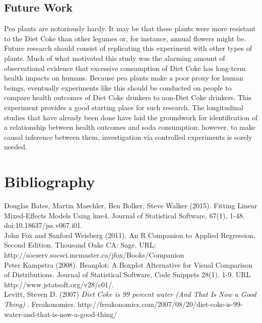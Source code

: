 \documentclass[1p,12pt]{elsarticle}\usepackage[]{graphicx}\usepackage[]{color}
\begin{document}
\subsection{Future Work}
Pea plants are notoriously hardy. It may be that these plants were more resistant to the Diet Coke than other legumes or, for instance, annual flowers might be. Future research should consist of replicating this experiment with other types of plants.  Much of what motivated this study was the alarming amount of observational evidence that excessive consumption of Diet Coke has long-term health impacts on humans. Because pea plants make a poor proxy for human beings, eventually experiments like this should be conducted on people to compare health outcomes of Diet Coke drinkers to non-Diet Coke drinkers. This experiment provides a good starting place for such research.  The longitudinal studies that have already been done have laid the groundwork for identification of a relationship between health outcomes and soda consumption; however, to make causal inference between them, investigation via controlled experiments is sorely needed. 



\newpage

\section{Bibliography}

  Douglas Bates, Martin Maechler, Ben Bolker, Steve Walker (2015). Fitting Linear Mixed-Effects Models Using lme4. Journal of Statistical Software, 67(1), 1-48. doi:10.18637/jss.v067.i01.
~ \\ 

John Fox and Sanford Weisberg (2011). An {R} Companion to Applied Regression, Second Edition. Thousand Oaks CA: Sage. URL:  \\http://socserv.socsci.mcmaster.ca/jfox/Books/Companion
~\\

Peter Kampstra (2008). Beanplot: A Boxplot Alternative for Visual Comparison of Distributions. Journal of Statistical Software, Code Snippets 28(1). 1-9. URL http://www.jstatsoft.org/v28/c01/.
~ \\ 


Levitt, Steven D. (2007) \textit{Diet Coke is 99 percent water (And That Is Now a Good Thing) }. Freakonomics. http://freakonomics.com/2007/08/20/diet-coke-is-99-water-and-that-is-now-a-good-thing/
~\\
\end{document}

